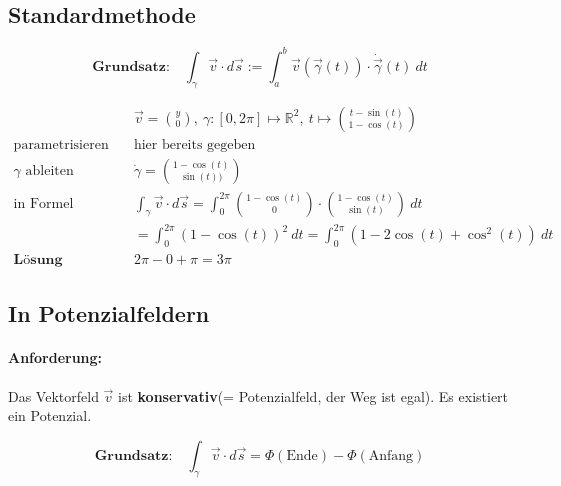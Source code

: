 \documentclass[11pt]{article}
\begin{document}
\subsection{Standardmethode}

\begin{equation*}
	\textbf{Grundsatz:}\quad \int_\gamma \vec{v}\cdot d\vec{s} := \int_a^b \vec{v}(\vec{\gamma}(t)) \cdot \dot\vec{\gamma}(t)\ dt
\end{equation*}

\begin{equation*}
\begin{split}
	& \vec{v} = \binom{y}{0},\ \gamma:[0, 2\pi] \mapsto \mathbb{R}^2,\ t \mapsto \binom{t -\sin(t)}{1-\cos(t)} \\
	\text{parametrisieren}\quad & \text{hier bereits gegeben} \\
	\text{$\gamma$ ableiten}\quad & \dot\gamma = \binom{1-\cos(t)}{\sin(t))} \\
	\text{in Formel einsetzen}\quad & \int_\gamma \vec{v} \cdot d\vec{s} = \int_0^{2\pi} \binom{1-\cos(t)}{0}\cdot\binom{1-\cos(t)}{\sin(t)}\ dt \\
	&= \int_0^{2\pi} (1-\cos(t))^2\ dt = \int_0^{2\pi} (1-2\cos(t)+\cos^2(t))\ dt \\
	\textbf{L{\"o}sung}\quad & 2\pi - 0 + \pi = 3\pi
\end{split}
\end{equation*}

\subsection{In Potenzialfeldern}

\paragraph{Anforderung:} Das Vektorfeld $\vec{v}$ ist \textbf{konservativ}(= Potenzialfeld, der Weg ist egal). Es existiert ein Potenzial.

\begin{equation*}
	\textbf{Grundsatz:}\quad\int_\gamma \vec{v} \cdot d\vec{s} = \Phi(\text{Ende}) - \Phi(\text{Anfang})
\end{equation*}
\end{document}
